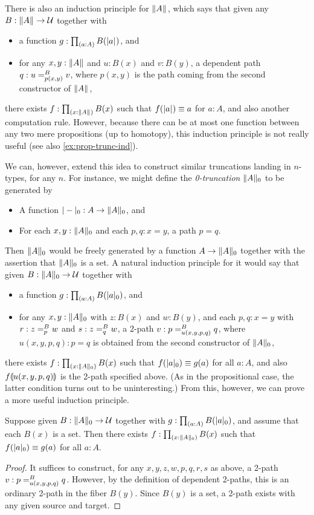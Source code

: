 There is also an induction principle for $\brck A$, which says that given any $B:\brck A \to \type$ together with
\begin{itemize}
\item a function $g:\prd{a:A} B(\bproj a)$, and
\item for any $x,y:\brck A$ and $u:B(x)$ and $v:B(y)$, a dependent path $q:\dpath{B}{p(x,y)}{u}{v}$, where $p(x,y)$ is the path coming from the second constructor of $\brck A$,
\end{itemize}
there exists $f:\prd{x:\brck A} B(x)$ such that $f(\bproj a)\jdeq a$ for $a:A$, and also another computation rule.
However, because there can be at most one function between any two mere propositions (up to homotopy), this induction principle is not really useful (see also \autoref{ex:prop-trunc-ind}).

We can, however, extend this idea to construct similar truncations landing in $n$-types, for any $n$.
For instance, we might define the \emph{0-truncation} $\trunc0A$ to be generated by
\begin{itemize}
\item A function $\tprojf0 : A \to \trunc0 A$, and
\item For each $x,y:\trunc0A$ and each $p,q:x=y$, a path $p=q$.
\end{itemize}
Then $\trunc0A$ would be freely generated by a function $A\to \trunc0A$ together with the assertion that $\trunc0A$ is a set.
A natural induction principle for it would say that given $B:\trunc0 A \to \type$ together with
\begin{itemize}
\item a function $g:\prd{a:A} B(\tproj0a)$, and
\item for any $x,y:\trunc0A$ with $z:B(x)$ and $w:B(y)$, and each $p,q:x=y$ with $r:\dpath{B}{p}{z}{w}$ and $s:\dpath{B}{q}{z}{w}$, a 2-path $v:\dpath{B}{u(x,y,p,q)}{p}{q}$, where $u(x,y,p,q):p=q$ is obtained from the second constructor of $\trunc0A$,
\end{itemize}
there exists $f:\prd{x:\trunc0A} B(x)$ such that $f(\tproj0a)\jdeq g(a)$ for all $a:A$, and also $\apd{f}{u(x,y,p,q)}$ is the 2-path specified above.
(As in the propositional case, the latter condition turns out to be uninteresting.)
From this, however, we can prove a more useful induction principle.

\begin{lem}\label{thm:trunc0-ind}
  Suppose given $B:\trunc0 A \to \type$ together with $g:\prd{a:A} B(\tproj0a)$, and assume that each $B(x)$ is a set.
  Then there exists $f:\prd{x:\trunc0A} B(x)$ such that $f(\tproj0a)\jdeq g(a)$ for all $a:A$.
\end{lem}
\begin{proof}
  It suffices to construct, for any $x,y,z,w,p,q,r,s$ as above, a 2-path $v:\dpath{B}{u(x,y,p,q)}{p}{q}$.
  However, by the definition of dependent 2-paths, this is an ordinary 2-path in the fiber $B(y)$.
  Since $B(y)$ is a set, a 2-path exists with any given source and target.
\end{proof}

